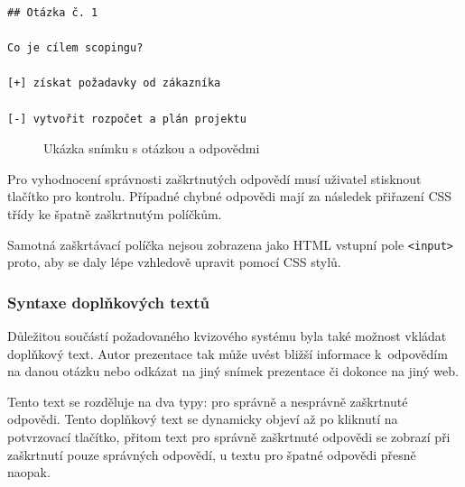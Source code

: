 \documentclass[11pt,twoside,a4paper]{book}
\begin{document}
\begin{lstlisting}[caption={Ukázka zdrojového textu snímku s otázkou a odpovědmi},label={lst:odpovedi}]
## Otázka č. 1

Co je cílem scopingu?

[+] získat požadavky od zákazníka

[-] vytvořit rozpočet a plán projektu
\end{lstlisting}


\begin{figure}[ht]
	\begin{center}
		\caption{Ukázka snímku s otázkou a odpovědmi}
		\label{fig:odpovedi}
	\end{center}
\end{figure}

Pro vyhodnocení správnosti zaškrtnutých odpovědí musí uživatel stisknout tlačítko pro kontrolu. Případné chybné odpovědi mají za následek přiřazení CSS třídy ke špatně zaškrtnutým políčkům.

Samotná zaškrtávací políčka nejsou zobrazena jako HTML vstupní pole \verb|<input>| proto, aby se daly lépe vzhledově upravit pomocí CSS stylů.

\subsubsection{Syntaxe doplňkových textů}
Důležitou součástí požadovaného kvizového systému byla také možnost vkládat doplňkový text. Autor prezentace tak může uvést bližší informace k~odpovědím na danou otázku nebo odkázat na jiný snímek prezentace či dokonce na jiný web.

Tento text se rozděluje na dva typy: pro správně a nesprávně zaškrtnuté odpovědi. Tento doplňkový text se dynamicky objeví až po kliknutí na potvrzovací tlačítko, přitom text pro správně zaškrtnuté odpovědi se zobrazí při zaškrtnutí pouze správných odpovědí, u textu pro špatné odpovědi přesně naopak.
\end{document}

